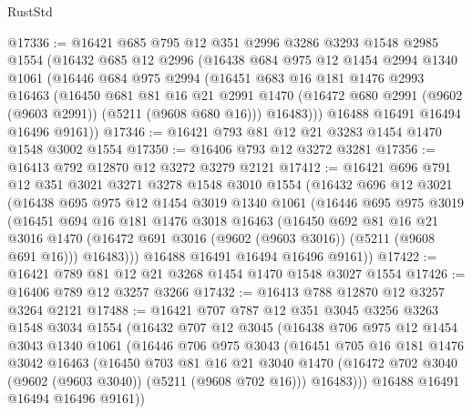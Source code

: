 \begin{lexlean}{RustStd}
\begin{coremodule}
@17336 := @16421
    @685
    @795
    @12
    @351
    @2996
    @3286
    @3293
    @1548
    @2985
    @1554
    (@16432
      @685
      @12
      @2996
      (@16438
        @684
        @975
        @12
        @1454
        @2994
        @1340
        @1061
        (@16446
          @684
          @975
          @2994
          (@16451
            @683
            @16
            @181
            @1476
            @2993
            @16463
            (@16450
              @681
              @81
              @16
              @21
              @2991
              @1470
              (@16472 @680 @2991 (@9602 (@9603 @2991)) (@5211 (@9608 @680 @16)))
              @16483)))
        @16488
        @16491
        @16494
        @16496
        @9161))
@17346 := @16421 @793 @81 @12 @21 @3283 @1454 @1470 @1548 @3002 @1554
@17350 := @16406 @793 @12 @3272 @3281
@17356 := @16413 @792 @12870 @12 @3272 @3279 @2121
@17412 := @16421
    @696
    @791
    @12
    @351
    @3021
    @3271
    @3278
    @1548
    @3010
    @1554
    (@16432
      @696
      @12
      @3021
      (@16438
        @695
        @975
        @12
        @1454
        @3019
        @1340
        @1061
        (@16446
          @695
          @975
          @3019
          (@16451
            @694
            @16
            @181
            @1476
            @3018
            @16463
            (@16450
              @692
              @81
              @16
              @21
              @3016
              @1470
              (@16472 @691 @3016 (@9602 (@9603 @3016)) (@5211 (@9608 @691 @16)))
              @16483)))
        @16488
        @16491
        @16494
        @16496
        @9161))
@17422 := @16421 @789 @81 @12 @21 @3268 @1454 @1470 @1548 @3027 @1554
@17426 := @16406 @789 @12 @3257 @3266
@17432 := @16413 @788 @12870 @12 @3257 @3264 @2121
@17488 := @16421
    @707
    @787
    @12
    @351
    @3045
    @3256
    @3263
    @1548
    @3034
    @1554
    (@16432
      @707
      @12
      @3045
      (@16438
        @706
        @975
        @12
        @1454
        @3043
        @1340
        @1061
        (@16446
          @706
          @975
          @3043
          (@16451
            @705
            @16
            @181
            @1476
            @3042
            @16463
            (@16450
              @703
              @81
              @16
              @21
              @3040
              @1470
              (@16472 @702 @3040 (@9602 (@9603 @3040)) (@5211 (@9608 @702 @16)))
              @16483)))
        @16488
        @16491
        @16494
        @16496
        @9161))

\end{coremodule}
\end{lexlean}

